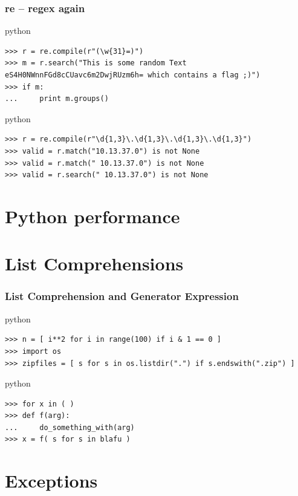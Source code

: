 \documentclass{beamer}
\begin{document}
\begin{frame}[fragile]
	\frametitle{re -- regex again}
	\begin{exampleblock}{python}
	\begin{lstlisting}
>>> r = re.compile(r"(\w{31}=)")
>>> m = r.search("This is some random Text eS4H0NWnnFGd8cCUavc6m2DwjRUzm6h= which contains a flag ;)")
>>> if m:
...     print m.groups()
	\end{lstlisting}
	\end{exampleblock}
\pause
	\begin{exampleblock}{python}
	\begin{lstlisting}
>>> r = re.compile(r"\d{1,3}\.\d{1,3}\.\d{1,3}\.\d{1,3}")
>>> valid = r.match("10.13.37.0") is not None
>>> valid = r.match(" 10.13.37.0") is not None
>>> valid = r.search(" 10.13.37.0") is not None
	\end{lstlisting}
	\end{exampleblock}
\end{frame}


\section{Python performance}	%

\section{List Comprehensions}	%

\begin{frame}[fragile]
	\frametitle{List Comprehension and Generator Expression}
	\begin{exampleblock}{python}
	\begin{lstlisting}
>>> n = [ i**2 for i in range(100) if i & 1 == 0 ]
>>> import os
>>> zipfiles = [ s for s in os.listdir(".") if s.endswith(".zip") ]
	\end{lstlisting}
	\end{exampleblock}
	
	\begin{exampleblock}{python}
	\begin{lstlisting}
>>> for x in ( )
>>> def f(arg):
...     do_something_with(arg)
>>> x = f( s for s in blafu )
	\end{lstlisting}
	\end{exampleblock}
\end{frame}

\section{Exceptions}	%
\end{document}
